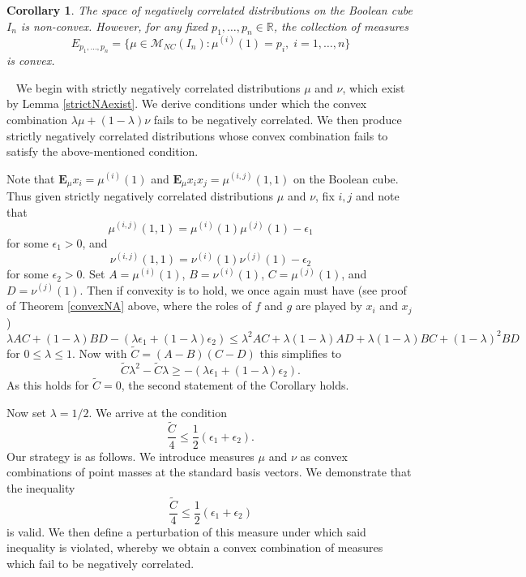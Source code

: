 \documentclass[11pt]{article}
\newcommand{\E}{\mathbf{E}}
\newcommand{\R}{\mathbb{R}}
\newcommand{\m}{\mathcal{M}}
\newtheorem{cor}{Corollary}
\newenvironment{Proof}{\noindent{\bf Proof} \ }{\QED}\smallskip
\newcommand\QED{\newline \rightline{$\blacksquare$} \bigskip}
\begin{document}
\begin{cor}
The space of negatively correlated distributions on the Boolean cube $I_n$ is non-convex. However, for any fixed $p_1,\dots, p_n \in \R$, the collection of measures
\[
E_{p_1,\dots, p_n} = \{\mu\in \m_{NC}(I_n) : \mu^{(i)}(1) = p_i, \; i=1,\dots, n\}
\]
is convex.
\end{cor}

\begin{Proof}
We begin with strictly negatively correlated distributions $\mu$ and 
$\nu$, which exist by Lemma \ref{strictNAexist}. We derive conditions under which the convex combination $\lambda\mu +(1-\lambda)\nu$ fails to be negatively correlated. We then produce strictly negatively correlated distributions whose convex combination fails to satisfy the above-mentioned condition.


Note that $\E_{\mu} x_i =\mu^{(i)}(1)$ and $\E_{\mu}x_ix_j =\mu^{(i,j)}(1,1)$ on the Boolean cube. Thus given strictly negatively correlated distributions $\mu$ and $\nu$, fix $i,j$ and note that 
\[
\mu^{(i,j)}(1,1) = \mu^{(i)}(1)\mu^{(j)}(1) -\epsilon_1
\]
for some $\epsilon_1>0$, and 
\[
\nu^{(i,j)}(1,1) = \nu^{(i)}(1)\nu^{(j)}(1) -\epsilon_2
\]
for some $\epsilon_2>0$.
Set $A= \mu^{(i)}(1)$, $B= \nu^{(i)}(1)$, $C= \mu^{(j)}(1)$,
and $D = \nu^{(j)}(1)$. Then if convexity is %
to hold, we once again must have (see proof of Theorem \ref{convexNA} above, where the roles of $f$ and $g$ are played by $x_i$ and $x_j$)
\[
\lambda AC +(1-\lambda)BD
-(\lambda\epsilon_1+(1-\lambda)\epsilon_2)
\leq \lambda^2 AC + \lambda(1-\lambda)AD
+\lambda(1-\lambda)BC + (1-\lambda)^2BD
\]
for $0\leq \lambda \leq 1.$ 
Now with $\tilde{C}=(A-B)(C-D)$ this simplifies to 
\[
\tilde{C}\lambda^2-\tilde{C}\lambda \geq -(\lambda \epsilon_1+(1-\lambda)\epsilon_2).
\]
As this holds for $\tilde{C}=0$, the second statement of the Corollary holds. 

Now set $\lambda=1/2$. We arrive at the condition 
\[
\frac{\tilde{C}}{4} \leq \frac{1}{2}(\epsilon_1+\epsilon_2).
\]
Our strategy is as follows. We introduce measures $\mu$ and $\nu$ as convex combinations of point masses at the standard basis vectors. We demonstrate that the inequality
\[
\frac{\tilde{C}}{4} \leq \frac{1}{2}(\epsilon_1+\epsilon_2)
\]
is valid. We then define a perturbation of this measure under which said inequality is violated, whereby we obtain a convex combination of measures which fail to be negatively correlated.


\end{Proof}
\end{document}
